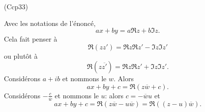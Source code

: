 \begin{tiny}(Ccp33)\end{tiny} Avec les notations de l'énoncé,
\[
 ax + by = a\Re z + b \Im z.
\]
Cela fait penser à
\[
 \Re(zz') = \Re z \Re z' - \Im z \Im z'
\]
ou plutôt à
\[
 \Re(z\overline{z'}) = \Re z \Re z' + \Im z \Im z'.
\]
Considérons $a + i b$ et nommons le $w$. Alors
\[
 ax + by + c = \Re(z\overline{w} + c).
\]
Considérons $-\frac{c}{\overline{w}}$ et nommons le $u$: alors $c = -\overline{w} u$ et
\[
 ax + by +c = \Re\left( z\overline{w} - u \overline{w}\right) = \Re\left( (z-u)\overline{w}\right).  
\]
